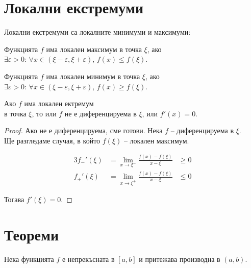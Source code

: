 
\section{Локални екстремуми}

\begin{definition}
    Локални екстремуми са локалните минимуми и максимуми:

    Функцията $f$ има локален максимум в точка $\xi$, ако
    $\exists \varepsilon > 0:\, \forall x \in(\xi-\varepsilon,\xi+\varepsilon),\,f(x) \leq f(\xi)$.

    Функцията $f$ има локален минимум в точка $\xi$, ако
    $\exists \varepsilon > 0:\, \forall x \in(\xi-\varepsilon,\xi+\varepsilon),\,f(x) \geq f(\xi)$.
\end{definition}

\begin{theorem}
    Ако $f$ има локален ектремум\\ в точка $\xi$, то или $f$ не е диференцируема в $\xi$, или $f'(x)=0$.

    \begin{proof}
        Ако не е диференцируема, сме готови. Нека $f$ -- диференцируема в $\xi$. \\
        Ще разгледаме случая, в който $f(\xi)$ -- локален максимум.

        \begin{alignat*}{3}
            f_{-}'(\xi) &= \lim_{x\to\xi^-}\frac{f(x)-f(\xi)}{x-\xi} &\geq 0 \\
            f_{+}'(\xi) &= \lim_{x\to\xi^+}\frac{f(x)-f(\xi)}{x-\xi} &\leq 0
        \end{alignat*}

        Тогава $f'(\xi) = 0$.
    \end{proof}
\end{theorem}

\section{Теореми}
Нека функцията $f$ е непрекъсната в $[a,b]$ и притежава производна в $(a,b)$.

